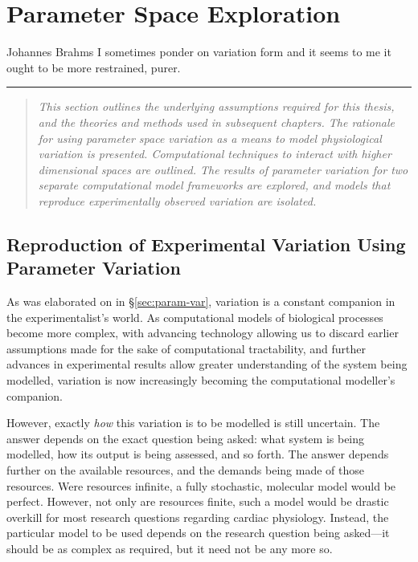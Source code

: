 \documentclass[../thesis-main.tex]{subfiles}
\begin{document}
\chapter{Parameter Space Exploration}
\label{ch:paramSpace}

\begin{aquote}{Johannes Brahms}
  {\selectfont
   I sometimes ponder on variation form and it seems to me it ought to be more restrained, purer.
  }
\end{aquote}
\rule{\linewidth}{0.25mm}

 \begin{quote}
  \emph{This section outlines the underlying assumptions required for this thesis, and the theories and methods used in subsequent chapters. The rationale for using parameter space variation as a means to model physiological variation is presented. Computational techniques to interact with higher dimensional spaces are outlined. The results of parameter variation for two separate computational model frameworks are explored, and models that reproduce experimentally observed variation are isolated.}
 \end{quote}
 
 \section{Reproduction of Experimental Variation Using Parameter Variation}
 \label{sec:rationale}
 As was elaborated on in \S\ref{sec:param-var}, variation is a constant companion in the experimentalist's world. As computational models of biological processes become more complex, with advancing technology allowing us to discard earlier assumptions made for the sake of computational tractability, and further advances in experimental results allow greater understanding of the system being modelled, variation is now increasingly becoming the computational modeller's companion.
 
 However, exactly \emph{how} this variation is to be modelled is still uncertain. The answer depends on the exact question being asked: what system is being modelled, how its output is being assessed, and so forth. The answer depends further on the available resources, and the demands being made of those resources. Were resources infinite, a fully stochastic, molecular model would be perfect. However, not only are resources finite, such a model would be drastic overkill for most research questions regarding cardiac physiology. Instead, the particular model to be used depends on the research question being asked---it should be as complex as required, but it need not be any more so.
 
\end{document}
